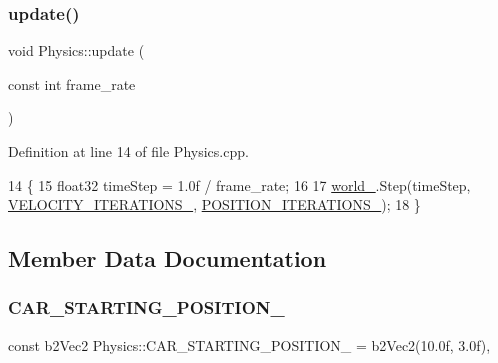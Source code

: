 \mbox{\label{classPhysics_a8ae58a3feb584b913d9fef04be7051b0}} 
\subsubsection{\texorpdfstring{update()}{update()}}
{\footnotesize\ttfamily void Physics\+::update (\begin{DoxyParamCaption}\item[{const int}]{frame\+\_\+rate }\end{DoxyParamCaption})}



Definition at line 14 of file Physics.\+cpp.


\begin{DoxyCode}
14                                          \{
15     float32 timeStep = 1.0f / frame\_rate;
16 
17     \hyperlink{classPhysics_a6f9efee327d116528efb9fd16b405bc6}{world\_}.Step(timeStep, \hyperlink{classPhysics_a8d5ed35d229b2ddd31656165b75d3c5a}{VELOCITY\_ITERATIONS\_}, 
      \hyperlink{classPhysics_a90cdfb590e59b99d0950ca696b00894c}{POSITION\_ITERATIONS\_});
18 \}
\end{DoxyCode}


\subsection{Member Data Documentation}
\mbox{\label{classPhysics_a960c795e535acff932299971c93aa166}} 
\subsubsection{\texorpdfstring{C\+A\+R\+\_\+\+S\+T\+A\+R\+T\+I\+N\+G\+\_\+\+P\+O\+S\+I\+T\+I\+O\+N\+\_\+}{CAR\_STARTING\_POSITION\_}}
{\footnotesize\ttfamily const b2\+Vec2 Physics\+::\+C\+A\+R\+\_\+\+S\+T\+A\+R\+T\+I\+N\+G\+\_\+\+P\+O\+S\+I\+T\+I\+O\+N\+\_\+ = b2\+Vec2(10.\+0f, 3.\+0f)\hspace{0.3cm}{\ttfamily [static]}, {\ttfamily [private]}}




